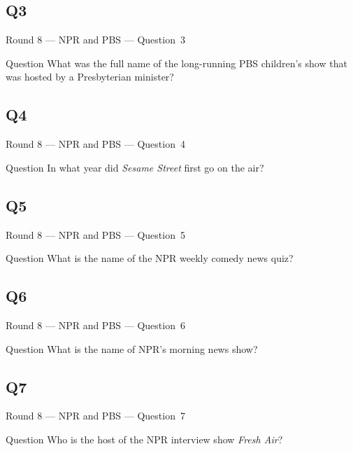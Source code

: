 \documentclass[11pt]{beamer}
\begin{document}
\subsection*{Q3}
\begin{frame}[t]{Round 8 --- NPR and PBS --- \mbox{Question 3}}
\vspace{-0.5em}
\begin{block}{Question}
What was the full name of the long-running PBS children's show that was hosted by a Presbyterian minister?
\end{block}
\end{frame}
\subsection*{Q4}
\begin{frame}[t]{Round 8 --- NPR and PBS --- \mbox{Question 4}}
\vspace{-0.5em}
\begin{block}{Question}
In what year did \emph{Sesame Street} first go on the air?
\end{block}
\end{frame}
\subsection*{Q5}
\begin{frame}[t]{Round 8 --- NPR and PBS --- \mbox{Question 5}}
\vspace{-0.5em}
\begin{block}{Question}
What is the name of the NPR weekly comedy news quiz?
\end{block}
\end{frame}
\subsection*{Q6}
\begin{frame}[t]{Round 8 --- NPR and PBS --- \mbox{Question 6}}
\vspace{-0.5em}
\begin{block}{Question}
What is the name of  NPR's morning news show? 
\end{block}
\end{frame}
\subsection*{Q7}
\begin{frame}[t]{Round 8 --- NPR and PBS --- \mbox{Question 7}}
\vspace{-0.5em}
\begin{block}{Question}
Who is the host of the NPR interview show \emph{Fresh Air}?
\end{block}
\end{frame}
\end{document}
